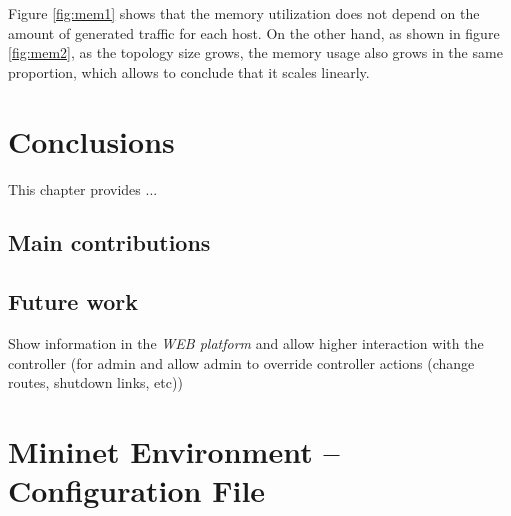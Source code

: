 \documentclass[12pt,english,oneside]{book}
\begin{document}
Figure \ref{fig:mem1} shows that the memory utilization does not depend on the amount of generated traffic for each host.
On the other hand, as shown in figure \ref{fig:mem2}, as the topology size grows, the memory usage also grows in the same proportion, which allows to conclude that it scales linearly.
\newpage

\chapter{Conclusions\label{cha:conclusions}}

This chapter provides ...

\section{Main contributions}

\section{Future work}

Show information in the \textit{WEB platform} and allow higher interaction with the controller (for admin and allow admin to override controller actions (change routes, shutdown links, etc))

\appendix

\chapter{Mininet Environment -- Configuration File\label{app:minconf}}
\end{document}
